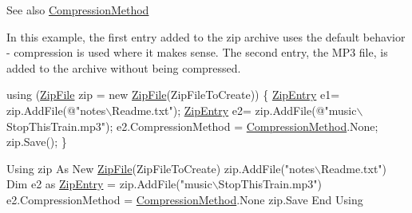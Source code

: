\begin{DoxySeeAlso}{See also}
\mbox{\hyperlink{class_super_tiled2_unity_1_1_ionic_1_1_zip_1_1_zip_entry_a8d566d136931133f42c0d6ef62c32f2c}{Compression\+Method}}


\end{DoxySeeAlso}


In this example, the first entry added to the zip archive uses the default behavior -\/ compression is used where it makes sense. The second entry, the M\+P3 file, is added to the archive without being compressed. 
\begin{DoxyCode}
\textcolor{keyword}{using} (\mbox{\hyperlink{namespace_super_tiled2_unity_1_1_ionic_1_1_zip_a9ced5352c56e7e0fceff15b534073c83a088ad16b06174c69965e232063ba6d16}{ZipFile}} zip = \textcolor{keyword}{new} \mbox{\hyperlink{namespace_super_tiled2_unity_1_1_ionic_1_1_zip_a9ced5352c56e7e0fceff15b534073c83a088ad16b06174c69965e232063ba6d16}{ZipFile}}(ZipFileToCreate))
\{
  \mbox{\hyperlink{class_super_tiled2_unity_1_1_ionic_1_1_zip_1_1_zip_entry_a440b6d4d136b20dc6bdbdd399397e3a0}{ZipEntry}} e1= zip.AddFile(\textcolor{stringliteral}{@"notes\(\backslash\)Readme.txt"});
  \mbox{\hyperlink{class_super_tiled2_unity_1_1_ionic_1_1_zip_1_1_zip_entry_a440b6d4d136b20dc6bdbdd399397e3a0}{ZipEntry}} e2= zip.AddFile(\textcolor{stringliteral}{@"music\(\backslash\)StopThisTrain.mp3"});
  e2.CompressionMethod = \mbox{\hyperlink{class_super_tiled2_unity_1_1_ionic_1_1_zip_1_1_zip_entry_a8d566d136931133f42c0d6ef62c32f2c}{CompressionMethod}}.None;
  zip.Save();
\}
\end{DoxyCode}



\begin{DoxyCode}
Using zip As New \mbox{\hyperlink{namespace_super_tiled2_unity_1_1_ionic_1_1_zip_a9ced5352c56e7e0fceff15b534073c83a088ad16b06174c69965e232063ba6d16}{ZipFile}}(ZipFileToCreate)
  zip.AddFile(\textcolor{stringliteral}{"notes\(\backslash\)Readme.txt"})
  Dim e2 as \mbox{\hyperlink{class_super_tiled2_unity_1_1_ionic_1_1_zip_1_1_zip_entry_a440b6d4d136b20dc6bdbdd399397e3a0}{ZipEntry}} = zip.AddFile(\textcolor{stringliteral}{"music\(\backslash\)StopThisTrain.mp3"})
  e2.CompressionMethod = \mbox{\hyperlink{class_super_tiled2_unity_1_1_ionic_1_1_zip_1_1_zip_entry_a8d566d136931133f42c0d6ef62c32f2c}{CompressionMethod}}.None
  zip.Save
End Using
\end{DoxyCode}
 \mbox{\label{class_super_tiled2_unity_1_1_ionic_1_1_zip_1_1_zip_entry_af0d953dffdfe37b0578bdd9b7a828361}} 
